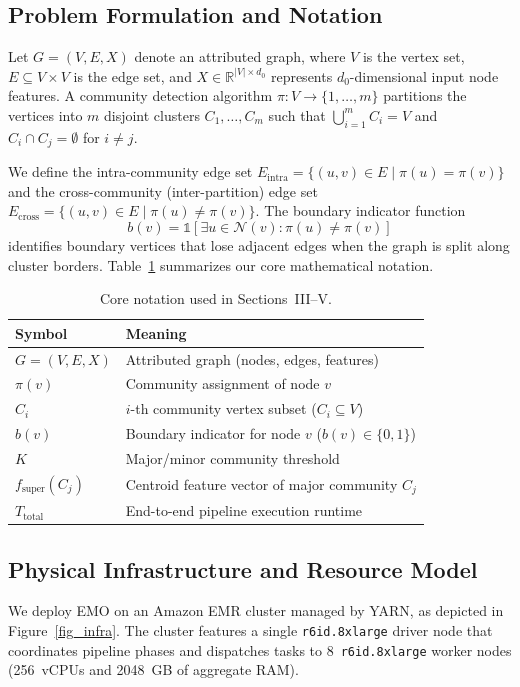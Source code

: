 \documentclass[conference,compsoc]{IEEEtran}
\begin{document}
\subsection{Problem Formulation and Notation}
Let $G=(V,E,X)$ denote an attributed graph, where $V$ is the vertex set, $E \subseteq V \times V$ is the edge set, and $X \in \mathbb{R}^{|V| \times d_0}$ represents $d_0$-dimensional input node features. A community detection algorithm $\pi: V \rightarrow \{1, \dots, m\}$ partitions the vertices into $m$ disjoint clusters $C_1, \dots, C_m$ such that $\bigcup_{i=1}^m C_i = V$ and $C_i \cap C_j = \emptyset$ for $i \neq j$.

We define the intra-community edge set $E_{\text{intra}} = \{(u,v) \in E \mid \pi(u) = \pi(v)\}$ and the cross-community (inter-partition) edge set $E_{\text{cross}} = \{(u,v) \in E \mid \pi(u) \neq \pi(v)\}$. The boundary indicator function
\begin{equation}
b(v) = \mathbb{1}\left[\exists u \in \mathcal{N}(v) : \pi(u) \neq \pi(v)\right]
\end{equation}
identifies boundary vertices that lose adjacent edges when the graph is split along cluster borders. Table~\ref{tab:notation_core} summarizes our core mathematical notation.

\begin{table}[!t]
\caption{Core notation used in Sections~III--V.}
\label{tab:notation_core}
\centering
\begin{tabular}{ll}
\toprule
\textbf{Symbol} & \textbf{Meaning} \\
\midrule
$G=(V,E,X)$ & Attributed graph (nodes, edges, features) \\
$\pi(v)$ & Community assignment of node $v$ \\
$C_i$ & $i$-th community vertex subset ($C_i \subseteq V$) \\
$b(v)$ & Boundary indicator for node $v$ ($b(v) \in \{0, 1\}$) \\
$K$ & Major/minor community threshold \\
$f_{\text{super}}(C_j)$ & Centroid feature vector of major community $C_j$ \\
$T_{\text{total}}$ & End-to-end pipeline execution runtime \\
\bottomrule
\end{tabular}
\end{table}

\subsection{Physical Infrastructure and Resource Model}
We deploy EMO on an Amazon EMR cluster managed by YARN, as depicted in Figure~\ref{fig_infra}. The cluster features a single \texttt{r6id.8xlarge} driver node that coordinates pipeline phases and dispatches tasks to 8~\texttt{r6id.8xlarge} worker nodes (256~vCPUs and 2048~GB of aggregate RAM). 
\end{document}
